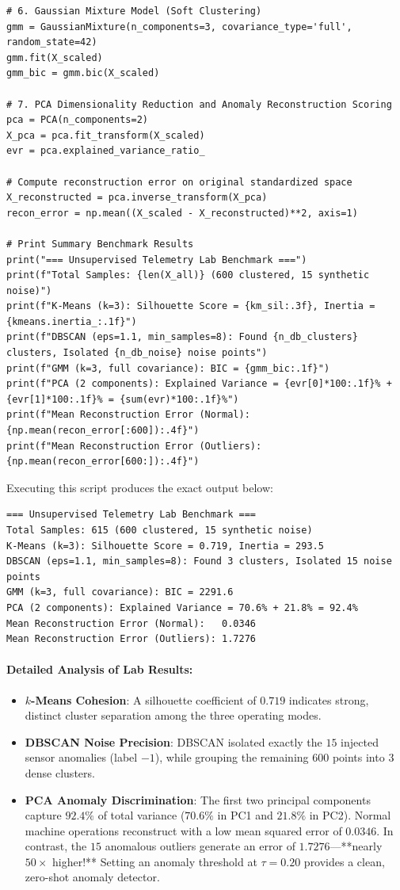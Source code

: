 \begin{lstlisting}[style=pythonstyle]
# 6. Gaussian Mixture Model (Soft Clustering)
gmm = GaussianMixture(n_components=3, covariance_type='full', random_state=42)
gmm.fit(X_scaled)
gmm_bic = gmm.bic(X_scaled)

# 7. PCA Dimensionality Reduction and Anomaly Reconstruction Scoring
pca = PCA(n_components=2)
X_pca = pca.fit_transform(X_scaled)
evr = pca.explained_variance_ratio_

# Compute reconstruction error on original standardized space
X_reconstructed = pca.inverse_transform(X_pca)
recon_error = np.mean((X_scaled - X_reconstructed)**2, axis=1)

# Print Summary Benchmark Results
print("=== Unsupervised Telemetry Lab Benchmark ===")
print(f"Total Samples: {len(X_all)} (600 clustered, 15 synthetic noise)")
print(f"K-Means (k=3): Silhouette Score = {km_sil:.3f}, Inertia = {kmeans.inertia_:.1f}")
print(f"DBSCAN (eps=1.1, min_samples=8): Found {n_db_clusters} clusters, Isolated {n_db_noise} noise points")
print(f"GMM (k=3, full covariance): BIC = {gmm_bic:.1f}")
print(f"PCA (2 components): Explained Variance = {evr[0]*100:.1f}% + {evr[1]*100:.1f}% = {sum(evr)*100:.1f}%")
print(f"Mean Reconstruction Error (Normal):   {np.mean(recon_error[:600]):.4f}")
print(f"Mean Reconstruction Error (Outliers): {np.mean(recon_error[600:]):.4f}")
\end{lstlisting}

Executing this script produces the exact output below:
\begin{lstlisting}[style=outputstyle]
=== Unsupervised Telemetry Lab Benchmark ===
Total Samples: 615 (600 clustered, 15 synthetic noise)
K-Means (k=3): Silhouette Score = 0.719, Inertia = 293.5
DBSCAN (eps=1.1, min_samples=8): Found 3 clusters, Isolated 15 noise points
GMM (k=3, full covariance): BIC = 2291.6
PCA (2 components): Explained Variance = 70.6% + 21.8% = 92.4%
Mean Reconstruction Error (Normal):   0.0346
Mean Reconstruction Error (Outliers): 1.7276
\end{lstlisting}

\paragraph{Detailed Analysis of Lab Results:}
\begin{itemize}
    \item \textbf{$k$-Means Cohesion}: A silhouette coefficient of $0.719$ indicates strong, distinct cluster separation among the three operating modes.
    \item \textbf{DBSCAN Noise Precision}: DBSCAN isolated exactly the $15$ injected sensor anomalies (label $-1$), while grouping the remaining $600$ points into $3$ dense clusters.
    \item \textbf{PCA Anomaly Discrimination}: The first two principal components capture $92.4\%$ of total variance ($70.6\%$ in PC1 and $21.8\%$ in PC2). Normal machine operations reconstruct with a low mean squared error of $0.0346$. In contrast, the $15$ anomalous outliers generate an error of $1.7276$---**nearly $50\times$ higher!** Setting an anomaly threshold at $\tau = 0.20$ provides a clean, zero-shot anomaly detector.
\end{itemize}

